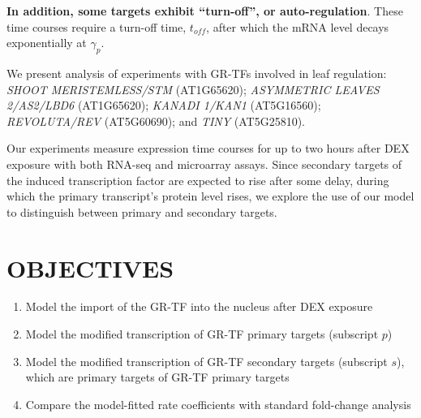 \documentclass[aspb,landscape]{a0poster}
\begin{document}
\begin{multicols}{3}
{    \textbf{In addition, some targets exhibit ``turn-off'', or auto-regulation}. These time courses require a turn-off time, $t_{off}$, after which the mRNA level decays exponentially at $\gamma_p$.
    
    We present analysis of experiments with GR-TFs involved in leaf regulation: 
    \textit{SHOOT MERISTEMLESS/STM} (AT1G65620);
    \textit{ASYMMETRIC LEAVES 2/AS2/LBD6} (AT1G65620);
    \textit{KANADI 1/KAN1} (AT5G16560); 
    \textit{REVOLUTA/REV} (AT5G60690); and 
    \textit{TINY} (AT5G25810).
    
    Our experiments measure expression time courses for up to two hours after DEX exposure with both RNA-seq and microarray assays.
    Since secondary targets of the induced transcription factor are expected to rise after some delay, during which the primary transcript's protein level rises,
    we explore the use of our model to distinguish between primary and secondary targets.

  }


  \section*{OBJECTIVES}
  \color{CarnegiePriBlue}  

  {
    \begin{enumerate}
    \item Model the import of the GR-TF into the nucleus after DEX exposure
    \item Model the modified transcription of GR-TF primary targets (subscript $p$)
    \item Model the modified transcription of GR-TF secondary targets (subscript $s$), which are primary targets of GR-TF primary targets
    \item Compare the model-fitted rate coefficients with standard fold-change analysis
    \end{enumerate}
  }

  \color{Black}



\end{multicols}
\end{document}
